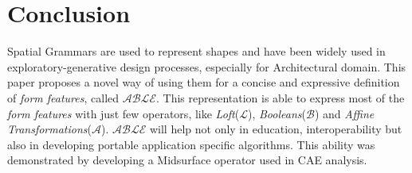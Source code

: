 \section{Conclusion}

Spatial Grammars are used to represent shapes and have been widely used in exploratory-generative design processes, especially for Architectural domain. This paper proposes a novel way of using them for a concise and expressive definition of {\em form features}, called {\bf $\mathcal{ABLE}$}. This representation is able to express most of the {\em form features} with just few operators, like {\em Loft}({\bf $\mathcal{L}$}), {\em Booleans}({\bf $\mathcal{B}$}) and {\em Affine Transformations}({\bf $\mathcal{A}$}). {\bf $\mathcal{ABLE}$} will help not only in education, interoperability but also in developing portable application specific algorithms. This ability was demonstrated by developing a Midsurface operator used in CAE analysis.
